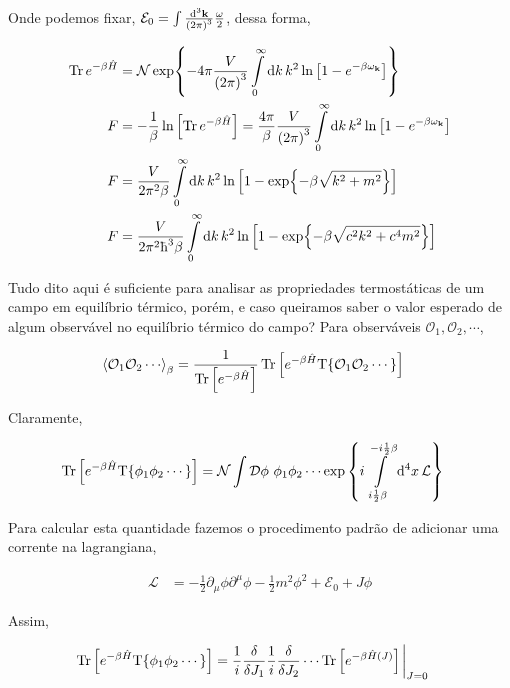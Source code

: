 \documentclass[twoside]{amsart}
\newcommand{\Dd}[1]{\mathcal D #1}
\numberwithin{equation}{section}
\begin{document}
Onde podemos fixar, $\mathcal E_0=\int\frac{\dd[3]{\vb k}}{\qty(2\pi)^3}\frac\omega2$, dessa forma,

\begin{align}
    \Tr e^{-\beta\hat H}&=\mathcal N\exp{-4\pi\frac{V}{\qty(2\pi)^3}\int\limits_0^\infty\dd{ k}k^2\ln\qty[1-e^{-\beta\omega_{\vb k}}]}\\
    F&=-\frac1\beta\ln\qty[\Tr e^{-\beta\hat H}]=\frac{4\pi}{\beta}\frac{V}{\qty(2\pi)^3}\int\limits_0^\infty\dd{ k}k^2\ln\qty[1-e^{-\beta\omega_{\vb k}}]\\
    F&=\frac{V}{2\pi^2\beta}\int\limits_0^\infty\dd{ k}k^2\ln\qty[1-\exp{-\beta\sqrt{k^2+m^2}}]\\
    F&=\frac{V}{2\pi^2\hbar^3\beta}\int\limits_0^\infty\dd{ k}k^2\ln\qty[1-\exp{-\beta\sqrt{c^2k^2+c^4m^2}}]
\end{align}

Tudo dito aqui é suficiente para analisar as propriedades termostáticas de um campo em equilíbrio térmico, porém, e caso queiramos saber o valor esperado de algum observável no equilíbrio térmico do campo? Para observáveis $\mathcal O_1,\mathcal O_2,\cdots$,

\begin{align}
    \expval{\mathcal O_1\mathcal O_2\cdots}_\beta&=\frac1{\Tr\qty[e^{-\beta\hat H}]}\Tr\qty[e^{-\beta\hat H}\textup{T}\qty{\mathcal O_1\mathcal O_2\cdots}]
\end{align}

Claramente,

\begin{align}
    \Tr\qty[e^{-\beta\hat H}\textup{T}\qty{\phi_1\phi_2\cdots}]&=\mathcal N\int\Dd{\phi}\ \phi _1\phi_2\cdots \exp\qty{i\int\limits_{i\frac12\beta}^{-i\frac12\beta}\dd[4]{x}\mathcal L}
\end{align}

Para calcular esta quantidade fazemos o procedimento padrão de adicionar uma corrente na lagrangiana,

\begin{align}
    \mathcal L&=-\frac12\partial_\mu\phi\partial^\mu\phi-\frac12m^2\phi^2+\mathcal E_0+J\phi
\end{align}

Assim,

\begin{align}
    \Tr\qty[e^{-\beta\hat H}\textup{T}\qty{\phi_1\phi_2\cdots}]&=\frac1i\fdv{}{J_1}\frac1i\fdv{}{J_2}\cdots\Tr\qty[e^{-\beta\hat H\qty(J)}]\eval_{J=0}
\end{align}
\end{document}
